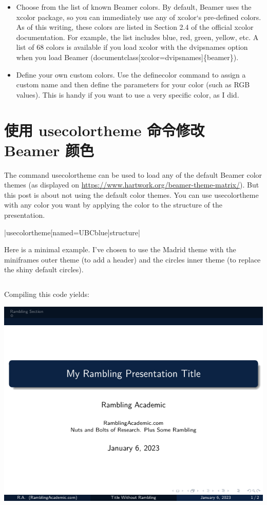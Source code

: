 \begin{column}{0.5\textwidth}
\begin{itemize}
  \item Choose from the list of known Beamer colors. By default, Beamer uses the xcolor package, so you can immediately use any of xcolor‘s pre-defined colors. As of this writing, these colors are listed in Section 2.4 of the official xcolor documentation. For example, the list includes blue, red, green, yellow, etc. A list of 68 colors is available if you load xcolor with the {\ttfamily dvipsnames} option when you load Beamer ({\ttfamily documentclass[xcolor=dvipsnames]\{beamer\}}).
  \item Define your own custom colors. Use the {\ttfamily definecolor} command to assign a custom name and then define the parameters for your color (such as RGB values). This is handy if you want to use a very specific color, as I did.
\end{itemize}

\section{使用 {\ttfamily usecolortheme} 命令修改 Beamer 颜色}

The command {\ttfamily usecolortheme} can be used to load any of the default Beamer color themes (as displayed on \url{https://www.hartwork.org/beamer-theme-matrix/}). 
But this post is about not using the default color themes. You can use {\ttfamily usecolortheme} with any color you want by applying the color to the {\ttfamily structure} of the presentation.

|{\ttfamily usecolortheme}[named=UBCblue]{structure}|

Here is a minimal example. I’ve chosen to use the Madrid theme with the {\ttfamily miniframes} outer theme (to add a header) and the {\ttfamily circles} inner theme (to replace the shiny default circles).

\inputminted[linenos=true]{latex}{examples/beamer/beamercolor01.tex}

Compiling this code yields:

\includegraphics[page=1]{examples/beamer/beamercolor01.pdf}


\end{column}
